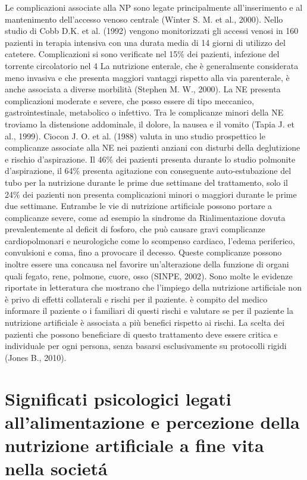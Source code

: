 \documentclass[12pt,a4paper,oneside]{book}
\begin{document}

Le complicazioni associate alla NP sono legate principalmente all'inserimento e al mantenimento dell'accesso venoso centrale (Winter S. M. et al., 2000). Nello studio di Cobb D.K. et al. (1992) vengono monitorizzati gli accessi venosi in 160 pazienti in terapia intensiva con una durata media di 14 giorni di utilizzo del catetere. Complicazioni si sono verificate nel 15\% dei pazienti, infezione del torrente circolatorio nel 4%
La nutrizione enterale, che \`e generalmente considerata meno invasiva e che presenta maggiori vantaggi rispetto alla via parenterale, \`e anche associata a diverse morbilit\`a (Stephen M. W., 2000). La NE presenta complicazioni moderate e severe, che posso essere di tipo meccanico, gastrointestinale, metabolico o infettivo. Tra le complicanze minori della NE troviamo la distensione addominale, il dolore, la nausea e il vomito (Tapia J. et al., 1999).
Ciocon J. O. et al. (1988) valuta in uno studio prospettico le complicanze associate alla NE nei pazienti anziani con disturbi della deglutizione e rischio d'aspirazione. Il 46\% dei pazienti presenta durante lo studio polmonite d'aspirazione, il 64\% presenta agitazione con conseguente auto-estubazione del tubo per la nutrizione durante le prime due settimane del trattamento, solo il 24\% dei pazienti non presenta complicazioni minori o maggiori durante le prime due settimane. 
Entrambe le vie di nutrizione artificiale possono portare a complicanze severe, come ad esempio la sindrome da Rialimentazione dovuta prevalentemente al deficit di fosforo, che pu\`o causare gravi complicanze cardiopolmonari e neurologiche come lo scompenso cardiaco, l'edema periferico, convulsioni e coma, fino a provocare il decesso. Queste complicanze possono inoltre essere una concausa nel favorire un'alterazione della funzione di organi quali fegato, rene, polmone, cuore, osso (SINPE, 2002).
Sono molte le evidenze riportate in letteratura che mostrano che l'impiego della nutrizione artificiale non \`e privo di effetti collaterali e rischi per il paziente. \`e compito del medico informare il paziente o i familiari di questi rischi e valutare se per il paziente la nutrizione artificiale \`e associata a pi\`u benefici rispetto ai rischi. La scelta dei pazienti che possono beneficiare di questo trattamento deve essere critica e individuale per ogni persona, senza basarsi esclusivamente su protocolli rigidi (Jones B., 2010).

\chapter{Significati psicologici legati all'alimentazione e percezione della nutrizione artificiale a fine vita nella societ\'a}
\label{sec:SignificatiPsicologici}
\end{document}
